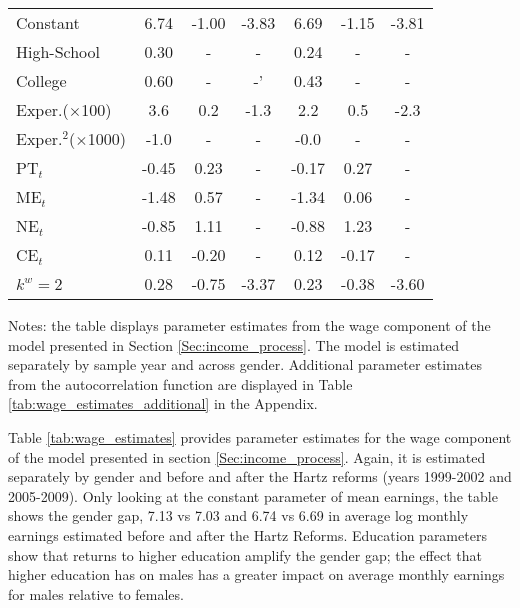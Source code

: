 \documentclass[12pt, a4paper]{article}
\begin{document}
\begin{table}[!t]
{{\begin{threeparttable}
\begin{tabular} {@{} l | c | c | c | c | c | c |  @{}}
\hline
Constant 	 	&6.74&-1.00&-3.83		&6.69&-1.15&-3.81 				\\[1mm]
High-School  	&0.30&-&-				&0.24&-&- 						\\[1mm]
College 		&0.60&-&-'				&0.43&-&- 						\\[1mm]
Exper.($\times$100)			  	&3.6&0.2&-1.3	  	&2.2&0.5&-2.3				\\[1mm]
Exper.$^2$($\times$1000)			&-1.0&-&-	  		&-0.0&-&-						\\[1mm]
PT$_{t}$				&-0.45&0.23&-			&-0.17&0.27&- 					\\[1mm]
ME$_{t}$				&-1.48&0.57&-			&-1.34&0.06&- 					\\[1mm]
NE$_{t}$				&-0.85&1.11&-			&-0.88&1.23&-					\\[1mm]
CE$_{t}$				&0.11&-0.20&-			&0.12&-0.17&-					\\[1mm]
$k^{w} = 2 $	&0.28&-0.75&-3.37		&0.23&-0.38&-3.60 				\\[1mm]
\hline
\end{tabular}
\begin{tablenotes}
\item {Notes: the table displays parameter estimates from the wage component of the model presented in Section \ref{Sec:income_process}. The model is estimated separately by sample year and across gender. Additional parameter estimates from the autocorrelation function are displayed in Table \ref{tab:wage_estimates_additional} in the Appendix.} 
\end{tablenotes}
\end{threeparttable}}}
\end{table}

Table \ref{tab:wage_estimates} provides parameter estimates for the wage component of the model presented in section \ref{Sec:income_process}. Again, it is estimated separately by gender and before and after the Hartz reforms (years 1999-2002 and 2005-2009). Only looking at the constant parameter of mean earnings, the table shows the gender gap, 7.13 vs 7.03 and 6.74 vs 6.69 in average log monthly earnings estimated before and after the Hartz Reforms. Education parameters show that returns to higher education amplify the gender gap; the effect that higher education has on males has a greater impact on average monthly earnings for males relative to females.
\end{document}
